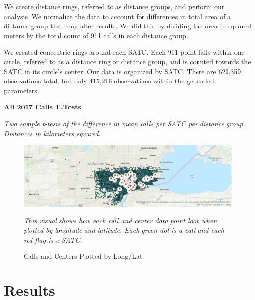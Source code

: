 \documentclass[12pt]{article}
\begin{document}
We create distance rings, referred to as distance groups, and perform our analysis. We normalize the data to account for differences in total area of a distance group that may alter results. We did this by dividing the area in squared meters by the total count of 911 calls in each distance group.

We created concentric rings around each SATC. Each 911 point falls within one circle, referred to as a distance ring or distance group, and is counted towards the SATC in its circle's center. Our data is organized by SATC. There are 620,359 observations total, but only 415,216 observations within the geocoded parameters.
\begin{table}[h]
\centering
\scalebox{0.8}{
\centering

}


\caption{\textbf{All 2017 Calls T-Tests}}
\label{tabl:Table}
\centering\textit{Two sample t-tests of the difference in mean calls per SATC per distance group.}
\textit{Distances in kilometers squared.}
\end{table}


\begin{figure}[h!]
    \centering
\includegraphics[width=0.75\linewidth]{Reproducibility Package/Visual Graphics/ArcGIS_Map.jpg}
    \caption{Calls and Centers Plotted by Long/Lat}
    \label{fig:Figure2}
     \textit{This visual shows how each call and center data point look when plotted by longitude and latitude.}
     \textit{Each green dot is a call and each red flag is a SATC.}
    
\end{figure}



\section{Results}
\label{sec:result}
\end{document}
